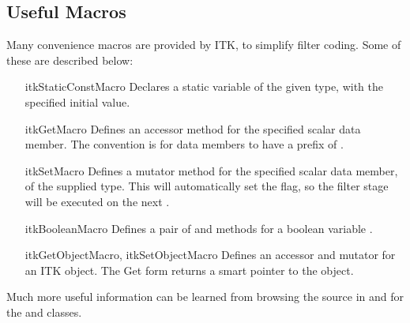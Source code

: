 \subsection{Useful Macros}

Many convenience macros are provided by ITK, to simplify filter coding. 
Some of these are described below:

\begin{itemize}
\item [itkStaticConstMacro] Declares a static variable of the given type,
  with the specified initial value. 
\item [itkGetMacro] Defines an accessor method for the specified scalar data
  member.  The convention is for data members to have a prefix of
  . 
\item [itkSetMacro] Defines a mutator method for the specified scalar data
  member, of the supplied type.  This will automatically set the
   flag, so the filter stage will be executed on the next
  . 
\item [itkBooleanMacro] Defines a pair of  and 
  methods for a boolean variable .
\item [itkGetObjectMacro, itkSetObjectMacro] Defines an accessor and mutator
  for an ITK object.  The Get form returns a smart pointer to the object.
\end{itemize}

Much more useful information can be learned from browsing the source in
 and for the  and
 classes. 



%
%
\ifitkFullVersion

\fi


%
%
